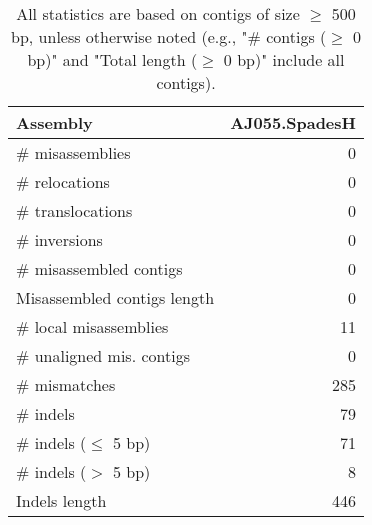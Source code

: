 \documentclass[12pt,a4paper]{article}
\begin{document}
\begin{table}[ht]
\begin{center}
\caption{All statistics are based on contigs of size $\geq$ 500 bp, unless otherwise noted (e.g., "\# contigs ($\geq$ 0 bp)" and "Total length ($\geq$ 0 bp)" include all contigs).}
\begin{tabular}{|l*{1}{|r}|}
\hline
Assembly & AJ055.SpadesH \\ \hline
\# misassemblies & 0 \\ \hline
\hspace{5mm}\# relocations & 0 \\ \hline
\hspace{5mm}\# translocations & 0 \\ \hline
\hspace{5mm}\# inversions & 0 \\ \hline
\# misassembled contigs & 0 \\ \hline
Misassembled contigs length & 0 \\ \hline
\# local misassemblies & 11 \\ \hline
\# unaligned mis. contigs & 0 \\ \hline
\# mismatches & 285 \\ \hline
\# indels & 79 \\ \hline
\hspace{5mm}\# indels ($\leq$ 5 bp) & 71 \\ \hline
\hspace{5mm}\# indels ($>$ 5 bp) & 8 \\ \hline
Indels length & 446 \\ \hline
\end{tabular}
\end{center}
\end{table}
\end{document}

